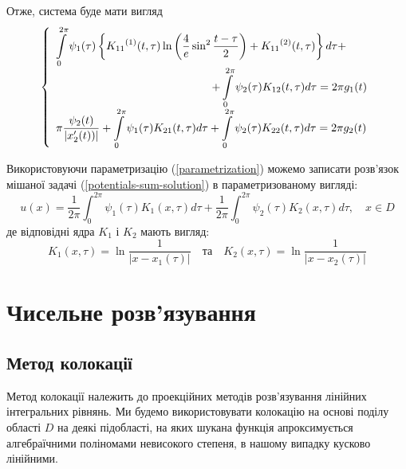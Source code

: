 \documentclass[14pt,a4paper]{extarticle}
\newcounter{e}
\numberwithin{equation}{section}
\numberwithin{figure}{section}
\newcommand{\intl}{\int\limits}
\newcommand{\inttwopi}{\intl_{0}^{2\pi}}
\begin{document}
Отже, система буде мати вигляд
\begin{equation}
	 \label{IE-parametrized}
	 \left\{
	 \begin{array}{l}
	 	\displaystyle
	 	\inttwopi \psi_1(\tau) \left\{ {K_{11}}^{(1)} (t, \tau) \ln{\left( \frac{4}{e} \sin^{2}{\frac{t - \tau}{2}} \right) } + {K_{11}}^{(2)} (t, \tau) \right\} d \tau +
	 	\\[0.3cm] \qquad \qquad \qquad \qquad \qquad \qquad \qquad
	 	\displaystyle
	 	+ \inttwopi \psi_2(\tau) K_{12}(t, \tau) d \tau
	 	= 2\pi g_{1}(t)
	 	\\ [0.3cm]
	 	
	 	\displaystyle
	 	\pi\frac{\psi_2(t)}{\abs{x'_{2}(t))}}
	 	+ \inttwopi \psi_1(\tau) K_{21}(t, \tau) d \tau
	 	+ \inttwopi \psi_2(\tau) K_{22}(t, \tau) d \tau
	 	= 2\pi g_{2}(t)
	 \end{array}\right.
\end{equation}
 
 Використовуючи параметризацію (\ref{parametrization}) можемо записати розв'язок мішаної задачі (\ref{potentials-sum-solution}) в параметризованому вигляді:
 \begin{equation} 
	 u(x)=\frac{1}{2 \pi} \int_{0}^{2 \pi} \psi_{1}(\tau) K_{1}(x, \tau) d \tau+\frac{1}{2 \pi} \int_{0}^{2 \pi}  \psi_{2}(\tau) K_{2}(x, \tau) d \tau, \quad x \in D
 \end{equation}
 де відповідні ядра $K_{1}$ і $K_{2}$ мають вигляд:
 \begin{equation}
  	K_{1}(x, \tau)=\ln \frac{1}{\left|x-x_{1}(\tau)\right|}
  	\quad \text{та} \quad 
 	K_{2}(x, \tau)=\ln \frac{1}{\left|x-x_{2}(\tau)\right|}
 \end{equation}
 
 
 
 
 \newpage
 \thispagestyle{empty}
 \section{Чисельне розв'язування}
 
 \subsection{Метод колокації}
 Метод колокації належить до проекційних методів розв'язування лінійних інтегральних рівнянь. Ми будемо використовувати колокацію на основі поділу області $D$ на деякі підобласті, на яких шукана функція апроксимується алгебраїчними поліномами невисокого степеня, в нашому випадку кусково лінійними.
 
\end{document}
